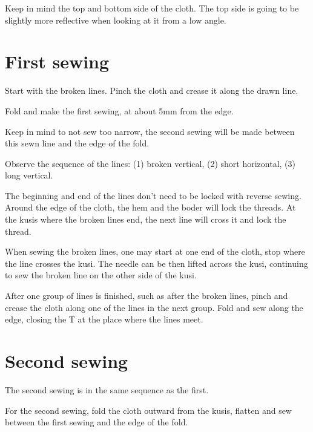 Keep in mind the top and bottom side of the cloth. The top side is going
to be slightly more reflective when looking at it from a low angle.

\section{First sewing}

Start with the broken lines. Pinch the cloth and crease it along the
drawn line.

Fold and make the first sewing, at about 5mm from the edge.

Keep in mind to not sew too narrow, the second sewing will be made
between this sewn line and the edge of the fold.



Observe the sequence of the lines: (1) broken vertical, (2) short
horizontal, (3) long vertical.

The beginning and end of the lines don't need to be locked with reverse
sewing. Around the edge of the cloth, the hem and the boder will lock
the threads. At the kusis where the broken lines end, the next line will
cross it and lock the thread.

When sewing the broken lines, one may start at one end of the cloth,
stop where the line crosses the kusi. The needle can be then lifted
across the kusi, continuing to sew the broken line on the other side of
the kusi.

After one group of lines is finished, such as after the broken lines,
pinch and crease the cloth along one of the lines in the next group.
Fold and sew along the edge, closing the T at the place where the lines
meet.

\section{Second sewing}

The second sewing is in the same sequence as the first.

For the second sewing, fold the cloth outward from the kusis, flatten
and sew between the first sewing and the edge of the fold.




